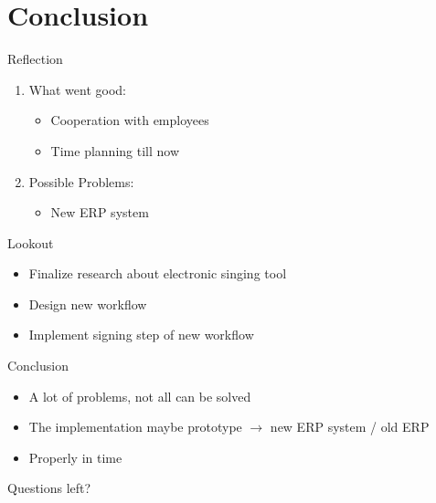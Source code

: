 \documentclass[utf8, xcolor, usenames,dvipsnames, aspectratio=169]{beamer}
\begin{document}
\section{Conclusion}
\begin{frame}{Reflection}
	\begin{enumerate}
		\item What went good:
		\begin{itemize}
			\item Cooperation with employees
			\item Time planning till now
		\end{itemize} 
		\item Possible Problems:
		\begin{itemize}
			\item New ERP system
		\end{itemize}
	\end{enumerate}
\end{frame}

\begin{frame}{Lookout}
	\begin{itemize}
		\item Finalize research about electronic singing tool
		\item Design new workflow
		\item Implement signing step of new workflow
	\end{itemize}
\end{frame}

\begin{frame}{Conclusion}
	\begin{itemize}
		\item A lot of problems, not all can be solved
		\item The implementation maybe prototype $\rightarrow$ new ERP system / old ERP
		\item Properly in time
	\end{itemize}
\end{frame}

\begin{frame}
	\begin{center}
		{\Huge Questions left?}
	\end{center}
\end{frame}
\end{document}

